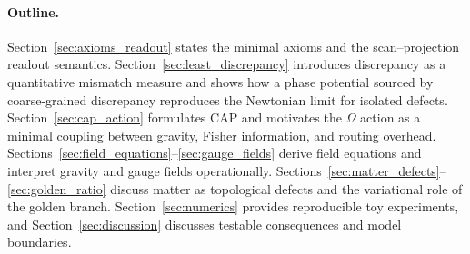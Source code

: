 \paragraph{Outline.}
Section~\ref{sec:axioms_readout} states the minimal axioms and the scan--projection readout semantics. Section~\ref{sec:least_discrepancy} introduces discrepancy as a quantitative mismatch measure and shows how a phase potential sourced by coarse-grained discrepancy reproduces the Newtonian limit for isolated defects. Section~\ref{sec:cap_action} formulates CAP and motivates the $\Omega$ action as a minimal coupling between gravity, Fisher information, and routing overhead. Sections~\ref{sec:field_equations}--\ref{sec:gauge_fields} derive field equations and interpret gravity and gauge fields operationally. Sections~\ref{sec:matter_defects}--\ref{sec:golden_ratio} discuss matter as topological defects and the variational role of the golden branch. Section~\ref{sec:numerics} provides reproducible toy experiments, and Section~\ref{sec:discussion} discusses testable consequences and model boundaries.


